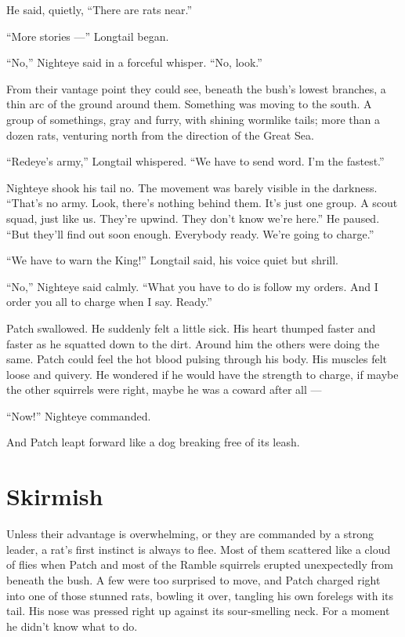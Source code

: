 \documentclass[ebook,oneside,openany,12pt]{memoir}
\begin{document}
He said, quietly, “There are rats near.”

“More stories —” Longtail began.

“No,” Nighteye said in a forceful whisper. “No, look.”

From their vantage point they could see, beneath the bush’s lowest
branches, a thin arc of the ground around them. Something was moving
to the south. A group of somethings, gray and furry, with shining
wormlike tails; more than a dozen rats, venturing north from the
direction of the Great Sea.

“Redeye’s army,” Longtail whispered. “We have to send word. I’m the
fastest.”

Nighteye shook his tail no. The movement was barely visible in the
darkness. “That’s no army. Look, there’s nothing behind them. It’s
just one group. A scout squad, just like us. They’re upwind. They
don’t know we’re here.” He paused. “But they’ll find out soon
enough. Everybody ready. We’re going to charge.”

“We have to warn the King!” Longtail said, his voice quiet but shrill.

“No,” Nighteye said calmly. “What you have to do is follow my
orders. And I order you all to charge when I say. Ready.”

Patch swallowed. He suddenly felt a little sick. His heart thumped
faster and faster as he squatted down to the dirt. Around him the
others were doing the same. Patch could feel the hot blood pulsing
through his body. His muscles felt loose and quivery. He wondered if
he would have the strength to charge, if maybe the other squirrels
were right, maybe he was a coward after all —

“Now!” Nighteye commanded.

And Patch leapt forward like a dog breaking free of its leash.


\section{Skirmish}

Unless their advantage is overwhelming, or they are commanded by a
strong leader, a rat’s first instinct is always to flee. Most of them
scattered like a cloud of flies when Patch and most of the Ramble
squirrels erupted unexpectedly from beneath the bush. A few were too
surprised to move, and Patch charged right into one of those stunned
rats, bowling it over, tangling his own forelegs with its tail. His
nose was pressed right up against its sour-smelling neck. For a moment
he didn’t know what to do.
\end{document}

